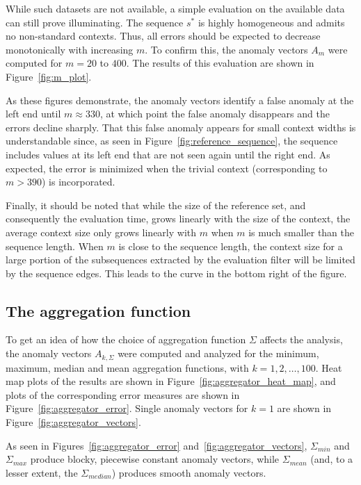 While such datasets are not available, a simple evaluation on the available data can still prove illuminating. The sequence $s^*$ is highly homogeneous and admits no non-standard contexts. Thus, all errors should be expected to decrease monotonically with increasing $m$. To confirm this, the anomaly vectors $A_m$ were computed for $m = 20$ to $400$. The results of this evaluation are shown in Figure~\ref{fig:m_plot}.

As these figures demonstrate, the anomaly vectors identify a false anomaly at the left end until $m \approx 330$, at which point the false anomaly disappears and the errors decline sharply. That this false anomaly appears for small context widths is understandable since, as seen in Figure~\ref{fig:reference_sequence}, the sequence includes values at its left end that are not seen again until the right end. As expected, the error is minimized when the trivial context (corresponding to $m > 390$) is incorporated.

Finally, it should be noted that while the size of the reference set, and consequently the evaluation time, grows linearly with the size of the context, the average context size only grows linearly with $m$ when $m$ is much smaller than the sequence length. When $m$ is close to the sequence length, the context size for a large portion of the subsequences extracted by the evaluation filter will be limited by the sequence edges. This leads to the curve in the bottom right of the figure.

\subsection{The aggregation function}
\label{sect:A}

To get an idea of how the choice of aggregation function $\Sigma$ affects the analysis, the anomaly vectors $A_{k, \Sigma}$ were computed and analyzed for the minimum, maximum, median and mean aggregation functions, with $k = 1,2,\dots,100$. Heat map plots of the results are shown in Figure~\ref{fig:aggregator_heat_map}, and plots of the corresponding error measures are shown in Figure~\ref{fig:aggregator_error}. Single anomaly vectors for $k=1$ are shown in Figure~\ref{fig:aggregator_vectors}.

As seen in Figures~\ref{fig:aggregator_error} and~\ref{fig:aggregator_vectors}, $\Sigma_{min}$ and $\Sigma_{max}$ produce blocky, piecewise constant anomaly vectors, while $\Sigma_{mean}$ (and, to a lesser extent, the $\Sigma_{median}$) produces smooth anomaly vectors.

